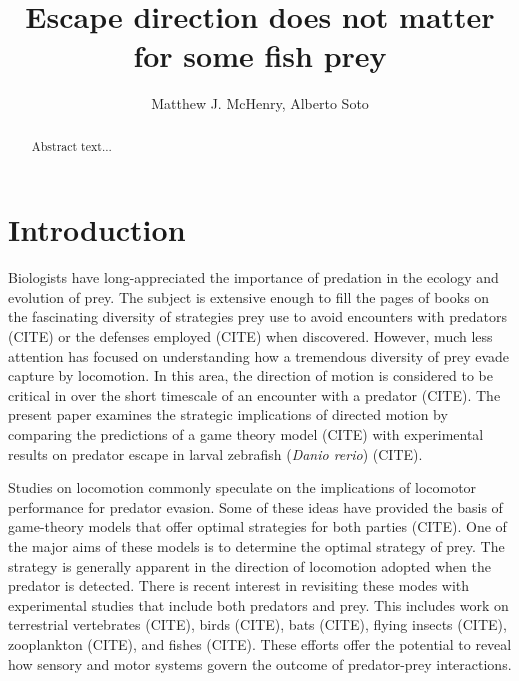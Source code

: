 \documentclass[12pt]{article}
\title{Escape direction does not matter for some fish prey}
\author{Matthew J. McHenry, Alberto Soto}
\begin{document}

\maketitle

\pagebreak


\begin{abstract}

Abstract text...

\end{abstract}

\pagebreak


\section{Introduction}

Biologists have long-appreciated the importance of predation in the ecology and evolution of prey. The subject is extensive enough to fill the pages of books on the fascinating diversity of strategies prey use to avoid encounters with predators (CITE) or the defenses employed (CITE) when discovered. However, much less attention has focused on understanding how a tremendous diversity of prey evade capture by locomotion. In this area, the direction of motion is considered to be critical in over the short timescale of an encounter with a predator (CITE). The present paper examines the strategic implications of directed motion by comparing the predictions of a game theory model (CITE) with experimental results on predator escape in larval zebrafish (\textit{Danio rerio}) (CITE).

Studies on locomotion commonly speculate on the implications of locomotor performance for predator evasion. Some of these ideas have provided the basis of game-theory models that offer optimal strategies for both parties (CITE). One of the major aims of these models is to determine the optimal strategy of prey. The strategy is generally apparent in the direction of locomotion adopted when the predator is detected. There is recent interest in revisiting these modes with experimental studies that include both predators and prey. This includes work on terrestrial vertebrates (CITE), birds (CITE), bats (CITE), flying insects (CITE), zooplankton (CITE), and fishes (CITE). These efforts offer the potential to reveal how sensory and motor systems govern the outcome of predator-prey interactions. 
\end{document}

